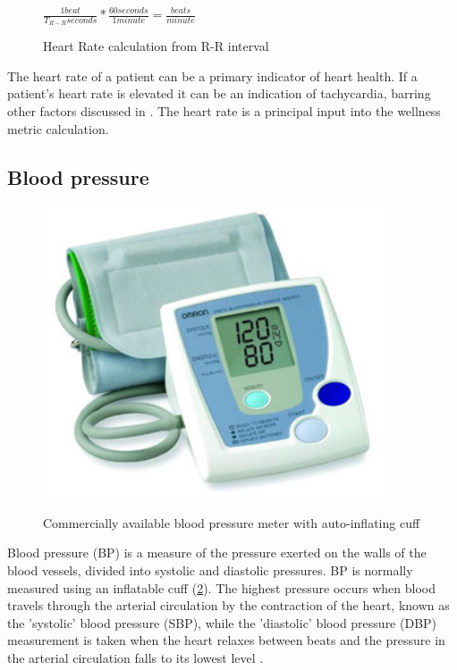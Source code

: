 \begin{figure}
	\begin{center}
		\label{fig:RR_PulseRateCalc}
		$\frac{1 beat}{T_{R-R} seconds}*\frac{60 seconds}{1 minute}=\frac{beats}{minute}$
		\caption{Heart Rate calculation from R-R interval}
	\end{center}
\end{figure}

The heart rate of a patient can be a primary indicator of heart health. If a patient's heart rate is elevated it can be an indication of tachycardia, barring other factors discussed in . The heart rate is a principal input into the wellness metric calculation.

\subsection{Blood pressure}
\label{subsec:BloodPressure}
\begin{figure}
	\begin{center}
		\label{fig:BP_cuff}
		\includegraphics[scale=1,width=0.9\textwidth]{Images/BPCuff.png} 
		\caption{Commercially available blood pressure meter with auto-inflating cuff}
	\end{center}
\end{figure}

Blood pressure (BP) is a measure of the pressure exerted on the walls of the blood vessels, divided into systolic and diastolic pressures. BP is normally measured using an inflatable cuff (\cref{fig:BP_cuff}). The highest pressure occurs when blood travels through the arterial circulation by the contraction of the heart,  known as the 'systolic' blood pressure (SBP), while the 'diastolic' blood pressure (DBP) measurement is taken when the heart relaxes between beats and the pressure in the arterial circulation falls to its lowest level \cite{NOORDIN2009}. 

